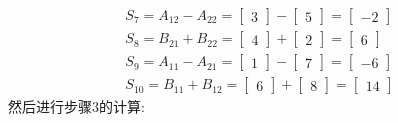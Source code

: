 \documentclass[a4paper,11pt]{article}
\begin{document}
\[\begin{align}
	  S_7 = A_{12}-A_{22}=
  	\begin{bmatrix}
 		3
  	\end{bmatrix}
		-
		\begin{bmatrix}
		5
		\end{bmatrix}
		=
		\begin{bmatrix}
		-2
		\end{bmatrix} \\

	  S_8 = B_{21}+B_{22}=
  	\begin{bmatrix}
 		4
  	\end{bmatrix}
		+
		\begin{bmatrix}
		2
		\end{bmatrix}
		=
		\begin{bmatrix}
		6
		\end{bmatrix} \\

	  S_9 = A_{11}-A_{21}=
  	\begin{bmatrix}
 		1
  	\end{bmatrix}
		-
		\begin{bmatrix}
		7
		\end{bmatrix}
		=
		\begin{bmatrix}
		-6
		\end{bmatrix} \\

		S_{10} = B_{11}+B_{12}=
  	\begin{bmatrix}
 		6
  	\end{bmatrix}
		+
		\begin{bmatrix}
		8
		\end{bmatrix}
		=
		\begin{bmatrix}
		14
		\end{bmatrix}
	\end{align}
\]
然后进行步骤3的计算:
\end{document}
